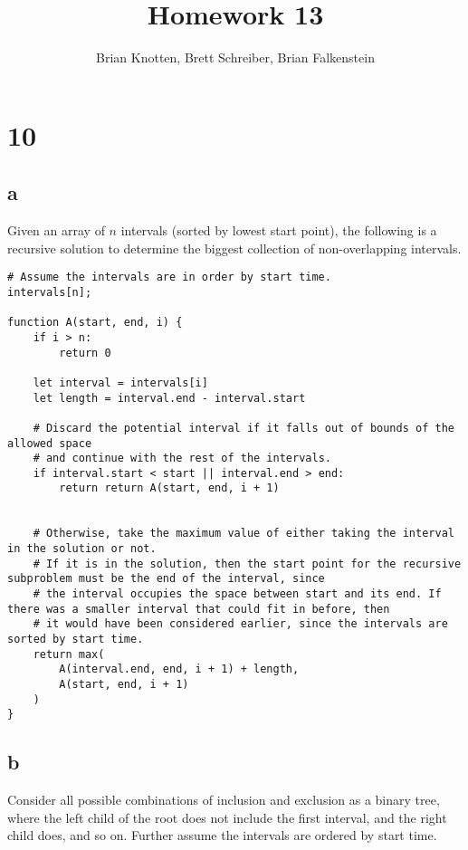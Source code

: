 \documentclass[letterpaper,notitlepage,twoside]{article}
\begin{document}
\title{Homework 13}
\author{Brian Knotten, Brett Schreiber, Brian Falkenstein}
\maketitle

\section*{10}
\subsection*{a}
Given an array of $n$ intervals (sorted by lowest start point), the following is a recursive solution to determine the biggest collection of non-overlapping intervals.
\begin{verbatim}
# Assume the intervals are in order by start time.
intervals[n];

function A(start, end, i) {
    if i > n:
        return 0
    
    let interval = intervals[i]
    let length = interval.end - interval.start
   
    # Discard the potential interval if it falls out of bounds of the allowed space
    # and continue with the rest of the intervals.
    if interval.start < start || interval.end > end:
        return return A(start, end, i + 1)
    
    
    # Otherwise, take the maximum value of either taking the interval in the solution or not.
    # If it is in the solution, then the start point for the recursive subproblem must be the end of the interval, since
    # the interval occupies the space between start and its end. If there was a smaller interval that could fit in before, then
    # it would have been considered earlier, since the intervals are sorted by start time.
    return max(
        A(interval.end, end, i + 1) + length,
        A(start, end, i + 1)
    )
}
\end{verbatim}


\subsection*{b}
Consider all possible combinations of inclusion and exclusion as a binary tree, where the left child of the root does not include the first interval, and the right child does, and so on. Further assume the intervals are ordered by start time.\\
\end{document}
